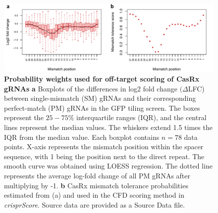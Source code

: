 \documentclass[pdftex,english,10pt]{article}
\begin{document}
\begin{figure}
\centering
\includegraphics[width=1\textwidth]{../analyses/casrx/sanjana//figures/casrx_supp.pdf}
  \caption{\textbf{Probability weights used for off-target scoring of CasRx gRNAs}
\textbf{a} Boxplots of the differences in log2 fold change $(\Delta$LFC) between single-mismatch (SM) gRNAs and their corresponding perfect-match (PM) gRNAs in the GFP tiling screen. 
The boxes represent the $25-75\%$ interquartile ranges (IQR), and the central lines represent the median values. The whiskers extend 1.5 times the IQR from the median value. Each boxplot contains $n=78$ data points. X-axis represents the mismatch position within the spacer sequence, with 1 being the position next to the direct repeat.
The smooth curve was obtained using LOESS regression. The dotted line represents the average log-fold change of all PM gRNAs after multiplying by -1. 
\textbf{b} CasRx mismatch tolerance probabilities estimated from (a) and used in the CFD scoring method in \textit{crisprScore}. Source data are provided as a Source Data file.
}
  \label{suppfig:casrx}
\end{figure}

\clearpage



\end{document}
